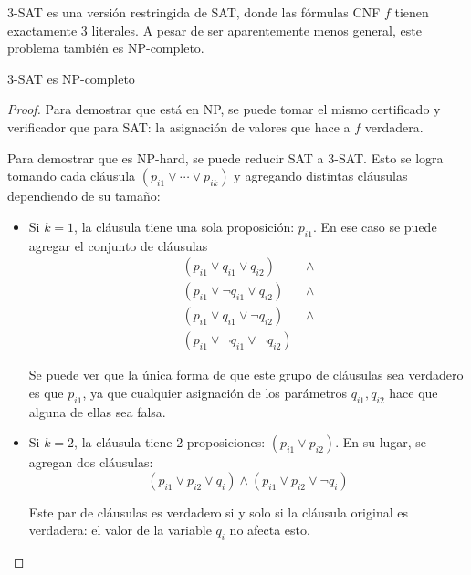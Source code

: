 3-SAT es una versión restringida de SAT, donde las fórmulas CNF $f$ tienen exactamente 3 literales. A pesar de ser aparentemente menos general, este problema también es NP-completo.
\begin{theorem*}
    3-SAT es NP-completo
\end{theorem*}
\begin{proof}
    Para demostrar que está en NP, se puede tomar el mismo certificado y verificador que para SAT: la asignación de valores que hace a $f$ verdadera.

    Para demostrar que es NP-hard, se puede reducir SAT a 3-SAT. Esto se logra tomando cada cláusula $(p_{i1} \lor \cdots \lor p_{ik})$ y agregando distintas cláusulas dependiendo de su tamaño:
    \begin{itemize}
        \item Si $k = 1$, la cláusula tiene una sola proposición: $p_{i1}$. En ese caso se puede agregar el conjunto de cláusulas
              \begin{align*}
                  (p_{i1} \lor q_{i1} \lor q_{i2})\            & \land \\
                  (p_{i1} \lor \neg q_{i1} \lor q_{i2})\       & \land \\
                  (p_{i1} \lor q_{i1} \lor \neg q_{i2})\       & \land \\
                  (p_{i1} \lor \neg q_{i1} \lor \neg q_{i2})\  &
              \end{align*}

              Se puede ver que la única forma de que este grupo de cláusulas sea verdadero es que $p_{i1}$, ya que cualquier asignación de los parámetros $q_{i1}, q_{i2}$ hace que alguna de ellas sea falsa.

        \item Si $k = 2$, la cláusula tiene 2 proposiciones: $(p_{i1} \lor p_{i2})$. En su lugar, se agregan dos cláusulas:
              $$(p_{i1} \lor p_{i2} \lor q_i) \land (p_{i1} \lor p_{i2} \lor \neg q_i)$$

              Este par de cláusulas es verdadero si y solo si la cláusula original es verdadera: el valor de la variable $q_i$ no afecta esto.


\end{itemize}
\end{proof}
